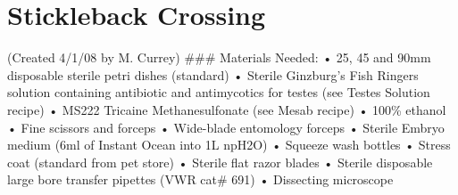 \documentclass[
]{book}
\begin{document}
\hypertarget{stickleback-crossing}{%
\section{Stickleback Crossing}\label{stickleback-crossing}}

(Created 4/1/08 by M. Currey)
\#\#\# Materials Needed:
• 25, 45 and 90mm disposable sterile petri dishes (standard)
• Sterile Ginzburg's Fish Ringers solution containing antibiotic and antimycotics for testes (see Testes Solution recipe)
• MS222 Tricaine Methanesulfonate (see Mesab recipe)
• 100\% ethanol
• Fine scissors and forceps
• Wide-blade entomology forceps
• Sterile Embryo medium (6ml of Instant Ocean into 1L npH2O)
• Squeeze wash bottles
• Stress coat (standard from pet store)
• Sterile flat razor blades
• Sterile disposable large bore transfer pipettes (VWR cat\# 691)
• Dissecting microscope
\end{document}
